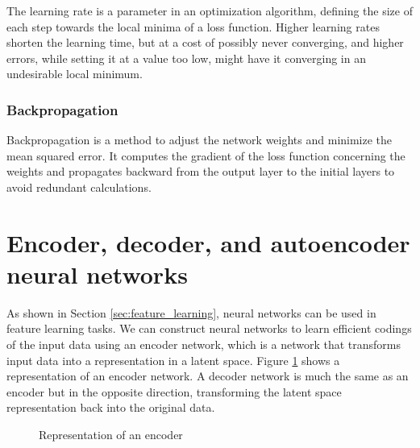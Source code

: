 The learning rate is a parameter in an optimization algorithm, defining the size of each step towards the local minima of a loss function. Higher learning rates shorten the learning time, but at a cost of possibly never converging, and higher errors, while setting it at a value too low, might have it converging in an undesirable local minimum.

\subsubsection{Backpropagation}

Backpropagation is a method to adjust the network weights and minimize the mean squared error. It computes the gradient of the loss function concerning the weights and propagates backward from the output layer to the initial layers to avoid redundant calculations.

\section{Encoder, decoder, and autoencoder neural networks}

As shown in Section \ref{sec:feature_learning}, neural networks can be used in feature learning tasks. We can construct neural networks to learn efficient codings of the input data using an encoder network, which is a network that transforms input data into a representation in a latent space. Figure \ref{fig:encoder} shows a representation of an encoder network. A decoder network is much the same as an encoder but in the opposite direction, transforming the latent space representation back into the original data.

\begin{figure}[!ht]
	\centering
	\caption{Representation of an encoder} \label{fig:encoder}
\end{figure}

